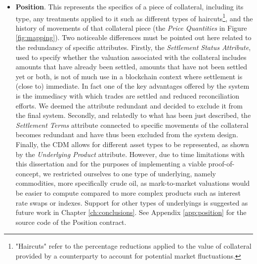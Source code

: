 \begin{itemize}
    \item \label{item:other_assets}\textbf{Position}. This represents the specifics of a piece of collateral, including its type, any treatments applied to it such as different types of haircuts\footnote{"Haircuts" refer to the percentage reductions applied to the value of collateral provided by a counterparty to account for potential market fluctuations.}, and the history of movements of that collateral piece (the \textit{Price Quantities} in Figure \ref{fig:mapping}). Two noticeable differences must be pointed out here related to the redundancy of specific attributes. Firstly, the \textit{Settlement Status Attribute}, used to specify whether the valuation associated with the collateral includes amounts that have already been settled, amounts that have not been settled yet or both, is not of much use in a blockchain context where settlement is (close to) immediate. In fact one of the key advantages offered by the system is the immediacy with which trades are settled and reduced reconciliation efforts. We deemed the attribute redundant and decided to exclude it from the final system. Secondly, and relatedly to what has been just described, the \textit{Settlement Terms} attribute connected to specific movements of the collateral becomes redundant and have thus been excluded from the system design. Finally, the CDM allows for different asset types to be represented, as shown by the \textit{Underlying Product} attribute. However, due to time limitations with this dissertation and for the purposes of implementing a viable proof-of-concept, we restricted ourselves to one type of underlying, namely commodities, more specifically crude oil, as mark-to-market valuations would be easier to compute compared to more complex products such as interest rate swaps or indexes. Support for other types of underlyings is suggested as future work in Chapter \ref{ch:conclusions}. See Appendix \ref{app:position} for the source code of the Position contract.
\end{itemize}

